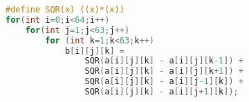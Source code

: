%
%
%
\begin{figure}[!h]
	\begin{subfigure}[]{}
		\centering
\begin{lstlisting}[columns=fullflexible, language=C, backgroundcolor=\color{white}]
#define SQR(x) ((x)*(x))
for(int i=0;i<64;i++)
	for(int j=1;j<63;j++)
		for (int k=1;k<63;k++)
			b[i][j][k] =
				SQR(a[i][j][k] - a[i][j][k-1]) +
				SQR(a[i][j][k] - a[i][j][k+1]) +
				SQR(a[i][j][k] - a[i][j-1][k]) +
				SQR(a[i][j][k] - a[i][j+1][k]);
		\end{lstlisting}
		\label{code}
	\end{subfigure}	
	

\end{figure}
